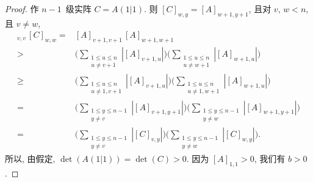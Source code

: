 \begin{proof}
    作 \(n-1\)~级实阵 \(C = A(1 | 1)\).
    则 \([C]_{w,y} = [A]_{w+1,y+1}\),
    且对 \(v\), \(w < n\),
    且 \(v \neq w\),
    \begin{align*}
        [C]_{v,v}\, [C]_{w,w}
        = {}    &
        [A]_{v+1,v+1}\, [A]_{w+1,w+1}
        \\
        > {}    &
        \Bigg(
        \sum_{\substack{1 \leq u \leq n   \\u \neq v+1}}
        {|[A]_{v+1,u}|}
        \Bigg)
        \Bigg(
        \sum_{\substack{1 \leq u \leq n   \\u \neq w+1}}
        {|[A]_{w+1,u}|}
        \Bigg)
        \\
        \geq {} &
        \Bigg(
        \sum_{\substack{1 \leq u \leq n   \\u \neq 1, v+1}}
        {|[A]_{v+1,u}|}
        \Bigg)
        \Bigg(
        \sum_{\substack{1 \leq u \leq n   \\u \neq 1, w+1}}
        {|[A]_{w+1,u}|}
        \Bigg)
        \\
        = {}    &
        \Bigg(
        \sum_{\substack{1 \leq y \leq n-1 \\y \neq v}}
        {|[A]_{v+1,y+1}|}
        \Bigg)
        \Bigg(
        \sum_{\substack{1 \leq y \leq n-1 \\y \neq w}}
        {|[A]_{w+1,y+1}|}
        \Bigg)
        \\
        = {}    &
        \Bigg(
        \sum_{\substack{1 \leq y \leq n-1 \\y \neq v}}
        {|[C]_{v,y}|}
        \Bigg)
        \Bigg(
        \sum_{\substack{1 \leq y \leq n-1 \\y \neq w}}
        {|[C]_{w,y}|}
        \Bigg).
    \end{align*}
    所以, 由假定, \(\det {(A(1|1))} = \det {(C)} > 0\).
    因为 \([A]_{1,1} > 0\), 我们有 \(b > 0\).


\end{proof}
